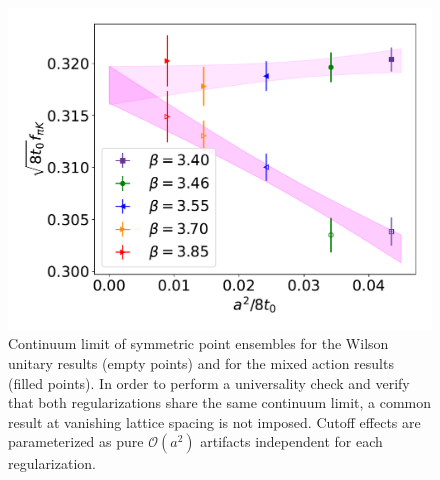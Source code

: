 \begin{figure}
    \centering
    \includegraphics[width=1.\textwidth]{./cap5/figs/continuum_sym.pdf}
    \caption{Continuum limit of symmetric point ensembles for the Wilson unitary results (empty points) and for the mixed action results (filled points). In order to perform a universality check and verify that both regularizations share the same continuum limit, a common result at vanishing lattice spacing is not imposed. Cutoff effects are parameterized as pure $\mathcal{O}(a^2)$ artifacts independent for each regularization.}
    \label{ch_ss:fig:universality}
\end{figure}


